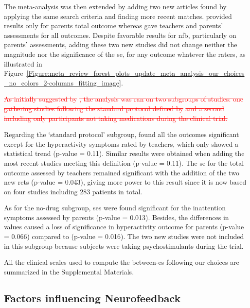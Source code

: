 The meta-analysis was then extended by adding two new articles \citep{Strehl2017, Baumeister2016} found 
by applying the same search criteria and finding more recent matches. \citet{Baumeister2016} provided results 
only for parents total outcome whereas \citet{Strehl2017} gave teachers and parents' assessments for all outcomes. 
Despite favorable results for \gls{nfb}, particularly on parents' assessments, adding these two new studies did not 
change neither the magnitude nor the significance of the \gls{se}, for any outcome whatever the raters,
as illustrated in Figure~\ref{Figure:meta_review_forest_plots_update_meta_analysis_our_choices_no_colors_2-columns_fitting_image}. 
 
\textcolor{red}{\sout{As initially suggested by }}\citeauthor{Cortese2016}\textcolor{red}{\sout{, the analysis was ran on two subgroups of studies: one gathering 
studies following the standard protocol defined by }} \citet{Arns2014} \textcolor{red}{\sout{and a second including only participants not taking medications 
during the clinical trial. }}

Regarding the `standard protocol' subgroup, \citet{Cortese2016} found all the outcomes significant except for the 
hyperactivity symptoms rated by teachers, which only showed a statistical trend (p-value = 0.11). Similar results 
were obtained when adding the most recent studies meeting this definition \citep{Strehl2017} (p-value = 0.11). 
The \gls{se} for the total outcome assessed by teachers remained significant with the addition of the two new
\glspl{rct} (p-value = 0.043), giving more power to this result since it is now based on four studies including 283
patients in total.

As for the no-drug subgroup, \glspl{se} were found significant for the inattention symptoms assessed by parents (p-value = 0.013). 
Besides, the differences in \citet{Arnold2014} values caused a loss of significance in hyperactivity outcome for parents 
(p-value = 0.066) compared to \citet{Cortese2016} (p-value = 0.016). The two new studies were not included in this 
subgroup because subjects were taking psychostimulants during the trial.

All the clinical scales used to compute the between-\gls{es} following our choices are summarized in the Supplemental Materials.

\subsection{Factors influencing Neurofeedback}

